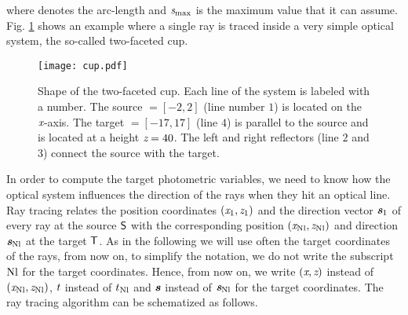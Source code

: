 where  denotes the arc-length and $\textit{s}_{\textrm{max}}$ is the maximum value that it can assume.
Fig. \ref{fig:cup} shows an example where a single ray is traced inside a very simple optical system, the so-called two-faceted cup.
\begin{figure}[h]
\label{fig:cup}
  \begin{center}
\vspace{-1.5cm}
  \texttt{[image: cup.pdf]}
  \end{center}
\vspace{-2cm}
  \caption{\footnotesize{Shape of the two-faceted cup.  Each line of the system is labeled with a number.
   The source $= [-2,2]$ (line number $1$) is located on the $\textit{x}$-axis.
   The target $= [-17, 17]$ (line $4$) is parallel to the source and is located at a height $\textit{z}= 40$.
   The left and right reflectors (line $2$ and $3$) connect the source with the target.}}
  \label{fig:cup}
\end{figure}
In order to compute the target photometric variables, we need to know how the optical system influences the direction of the rays when they hit an optical line.
Ray tracing relates the position coordinates
 $ (\textit{x}_1, \textit{z}_1)$ and the direction vector $\textit{\textbf{s}}_1$ of every ray at the source $\textsf{S}$ with the corresponding position $(\textit{x}_{\textrm{Nl}}, \textit{z}_{\textrm{Nl}})$ and direction $\textit{\textbf{s}}_{\textrm{Nl}}$
 at the target $\textsf{T}$. As in the following we will use often the target coordinates of the rays, from now on, to simplify the notation, we do not write the subscript $\textrm{Nl}$ for the target coordinates. Hence, from now on, we write $(\textit{x},\textit{z})$ instead of $(\textit{x}_{\textrm{Nl}}, \textit{z}_{\textrm{Nl}})$,  $t$ instead of $t_{\textrm{Nl}}$ and $\textit{\textbf{s}}$ instead of $\textit{\textbf{s}}_{\textrm{Nl}}$ for the target coordinates.
The ray tracing algorithm can be schematized as follows.
